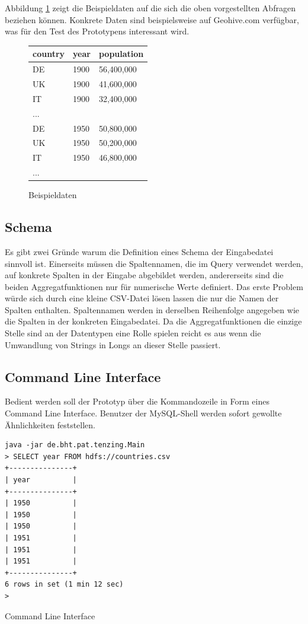 \documentclass[a4paper]{article}
\begin{document}
Abbildung \ref{fig:sampledata} zeigt die Beispieldaten auf die sich die oben vorgestellten Abfragen beziehen können. Konkrete Daten sind beispielsweise auf Geohive.com \cite{GeoHive} verfügbar, was für den Test des Prototypens interessant wird.

\begin{figure}[H]
\centering
\begin{tabular}{l l l}
	\toprule
	country & year & population \\
	\midrule
	DE & 1900 & 56,400,000 \\
	UK & 1900 & 41,600,000 \\
	IT & 1900 & 32,400,000 \\
	... \\
	DE & 1950 & 50,800,000 \\
	UK & 1950 & 50,200,000 \\
	IT & 1950 & 46,800,000\\	
	... \\
	\bottomrule
\end{tabular}
\caption{Beispieldaten}
\label{fig:sampledata}
\end{figure}

\subsection{Schema}
Es gibt zwei Gründe warum die Definition eines Schema der Eingabedatei sinnvoll ist. Einerseits müssen die Spaltennamen, die im Query verwendet werden, auf konkrete Spalten in der Eingabe abgebildet werden, andererseits sind die beiden Aggregatfunktionen nur für numerische Werte definiert. Das erste Problem würde sich durch eine kleine CSV-Datei lösen lassen die nur die Namen der Spalten enthalten. Spaltennamen werden in derselben Reihenfolge angegeben wie die Spalten in der konkreten Eingabedatei. Da die Aggregatfunktionen die einzige Stelle sind an der Datentypen eine Rolle spielen reicht es aus wenn die Umwandlung von Strings in Longs an dieser Stelle passiert.


\subsection{Command Line Interface}
Bedient werden soll der Prototyp über die Kommandozeile in Form eines Command Line Interface. Benutzer der MySQL-Shell werden sofort gewollte Ähnlichkeiten feststellen.

\begin{listing}[H]
\begin{verbatim}
java -jar de.bht.pat.tenzing.Main
> SELECT year FROM hdfs://countries.csv
+---------------+
| year          |
+---------------+
| 1950          |
| 1950          |
| 1950          |
| 1951          |
| 1951          |
| 1951          |
+---------------+
6 rows in set (1 min 12 sec)
>
\end{verbatim}
\caption{Command Line Interface}
\label{lst:cli}
\end{listing}
\end{document}

